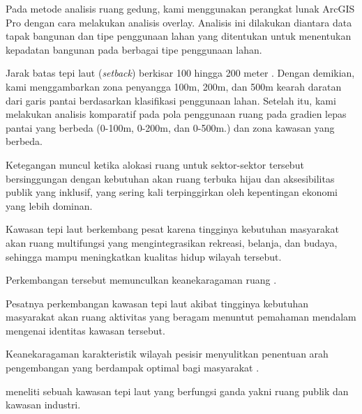 \documentclass[../riset_senja.tex]{subfiles}
\begin{document}
Pada metode analisis ruang gedung, kami menggunakan perangkat lunak ArcGIS Pro dengan cara melakukan analisis overlay. Analisis ini dilakukan diantara data tapak bangunan dan tipe penggunaan lahan yang ditentukan untuk menentukan kepadatan bangunan pada berbagai tipe penggunaan lahan.

Jarak batas tepi laut (\textit{setback}) berkisar 100 hingga 200 meter \citep{sun2020}. Dengan demikian, kami menggambarkan zona penyangga 100m, 200m, dan 500m kearah daratan dari garis pantai berdasarkan klasifikasi penggunaan lahan. Setelah itu, kami melakukan analisis komparatif pada pola penggunaan ruang pada gradien lepas pantai yang berbeda (0-100m, 0-200m, dan 0-500m.) dan zona kawasan yang berbeda.





Ketegangan muncul ketika alokasi ruang untuk sektor-sektor tersebut bersinggungan dengan kebutuhan akan ruang terbuka hijau dan aksesibilitas publik yang inklusif, yang sering kali terpinggirkan oleh kepentingan ekonomi yang lebih dominan.




Kawasan tepi laut berkembang pesat karena tingginya kebutuhan masyarakat akan ruang multifungsi yang mengintegrasikan rekreasi, belanja, dan budaya, sehingga mampu meningkatkan kualitas hidup wilayah tersebut.





Perkembangan tersebut memunculkan keanekaragaman ruang \citep{huang2025}.




Pesatnya perkembangan kawasan tepi laut akibat tingginya kebutuhan masyarakat akan ruang aktivitas yang beragam menuntut pemahaman mendalam mengenai identitas kawasan tersebut.





Keanekaragaman karakteristik wilayah pesisir menyulitkan penentuan arah pengembangan yang berdampak optimal bagi masyarakat \citep{hoppe2011}.





\citet{hoppe2011} meneliti sebuah kawasan tepi laut yang berfungsi ganda yakni ruang publik dan kawasan industri.
\end{document}
